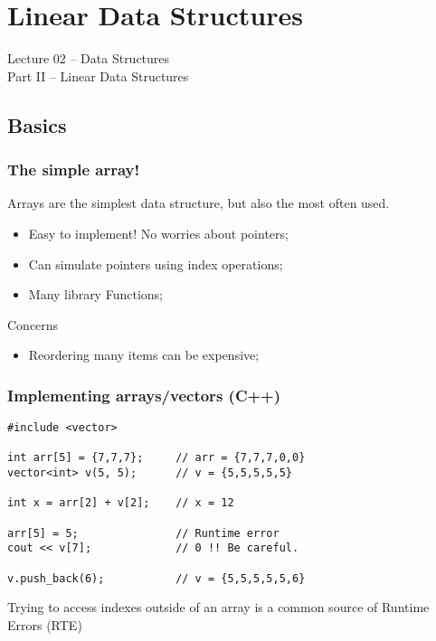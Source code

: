 \section{Linear Data Structures}

\begin{frame}
  \begin{center}
    {\large Lecture 02 -- Data Structures\\Part II -- Linear Data Structures}\\
  \end{center}
\end{frame}

\subsection{Basics}

\begin{frame}
  \frametitle{The simple array!}
  Arrays are the simplest data structure, but also the most often used.

  \bigskip

  \begin{itemize}
  \item Easy to implement! No worries about pointers;
  \item Can simulate pointers using index operations;
  \item Many library Functions;
  \end{itemize}

  \bigskip

  \alert{Concerns}
  \begin{itemize}
  \item Reordering many items can be expensive;
  \end{itemize}
\end{frame}


\begin{frame}[fragile]
  \frametitle{Implementing arrays/vectors (C++)}
  {\small
\begin{verbatim}
#include <vector>

int arr[5] = {7,7,7};     // arr = {7,7,7,0,0}
vector<int> v(5, 5);      // v = {5,5,5,5,5}

int x = arr[2] + v[2];    // x = 12

arr[5] = 5;               // Runtime error
cout << v[7];             // 0 !! Be careful.

v.push_back(6);           // v = {5,5,5,5,5,6}
\end{verbatim}
  }

  \begin{alertblock}{}
    Trying to access indexes outside of an array is a common source of
    Runtime Errors (RTE)
  \end{alertblock}

\end{frame}

